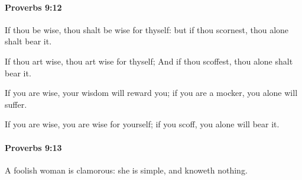		\paragraph{Proverbs 9:12} %
			\label{PROVERBS-9-12}

			If thou be wise, thou shalt be wise for thyself: but if thou scornest, thou alone shalt bear it.

			\begin{versebox}
					\item[BHS] 
					\item[ASV] If thou art wise, thou art wise for thyself; And if thou scoffest, thou alone shalt bear it.
					\item[NIV] If you are wise, your wisdom will reward you; if you are a mocker, you alone will suffer.
					\item[NRSV] If you are wise, you are wise for yourself; if you scoff, you alone will bear it.
			\end{versebox}

		\paragraph{Proverbs 9:13} %
			\label{PROVERBS-9-13}

			A foolish woman is clamorous: she is simple, and knoweth nothing.

